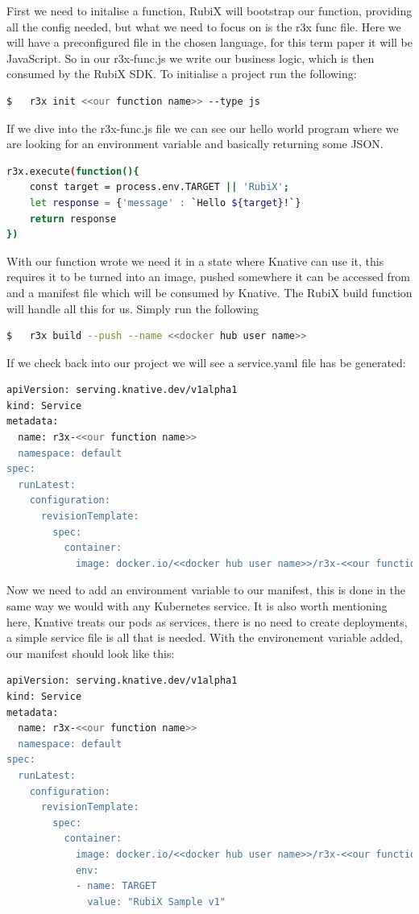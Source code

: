 First we need to initalise a function, RubiX will bootstrap our function, providing all the config needed, but what we need to focus on is the r3x func file. Here we will have a preconfigured file in the chosen language, for this term paper it will be JavaScript. So in our r3x-func.js we write our business logic, which is then consumed by the RubiX SDK. To initialise a project run the following:

\begin{lstlisting}[language=bash]
  $   r3x init <<our function name>> --type js
\end{lstlisting}
If we dive into the r3x-func.js file we can see our hello world program where we are looking for an environment variable and basically returning some JSON. 
\begin{lstlisting}[language=bash]
  r3x.execute(function(){
	const target = process.env.TARGET || 'RubiX';
	let response = {'message' : `Hello ${target}!`}
	return response 
})
\end{lstlisting}
With our function wrote we need it in a state where Knative can use it, this requires it to be turned into an image, pushed somewhere it can be accessed from and a manifest file which will be consumed by Knative. The RubiX build function will handle all this for us. Simply run the following
\begin{lstlisting}[language=bash]
  $   r3x build --push --name <<docker hub user name>>
\end{lstlisting}
\clearpage
If we check back into our project we will see a service.yaml file has be generated:
\begin{lstlisting}[language=bash]
apiVersion: serving.knative.dev/v1alpha1
kind: Service
metadata:
  name: r3x-<<our function name>>
  namespace: default
spec:
  runLatest:
    configuration:
      revisionTemplate:
        spec:
          container:
            image: docker.io/<<docker hub user name>>/r3x-<<our function name>>
\end{lstlisting}
Now we need to add an environment variable to our manifest, this is done in the same way we would with any Kubernetes service. It is also worth mentioning here, Knative treats our pods as services, there is no need to create deployments, a simple service file is all that is needed. With the environement variable added, our manifest should look like this:
\begin{lstlisting}[language=bash]
apiVersion: serving.knative.dev/v1alpha1
kind: Service
metadata:
  name: r3x-<<our function name>>
  namespace: default
spec:
  runLatest:
    configuration:
      revisionTemplate:
        spec:
          container:
            image: docker.io/<<docker hub user name>>/r3x-<<our function name>>
            env:
            - name: TARGET
              value: "RubiX Sample v1"
\end{lstlisting}
